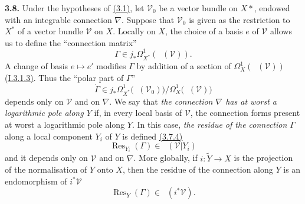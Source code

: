 \documentclass{report}
\newenvironment{rmenv}[1]
  {\phantomsection\par\medskip\noindent\textbf{#1.}\rmfamily}
  {\medskip}
\renewcommand{\cal}[1]{{\mathcal{#1}}}
\DeclareMathOperator{\shEnd}{\underline{End}}
\DeclareMathOperator{\Res}{Res}
\begin{document}
\begin{rmenv}{3.8}
\label{II.3.8}
  Under the hypotheses of \hyperref[II.3.1]{(3.1)}, let $\cal{V}_0$ be a vector bundle on $X*$, endowed with an integrable connection $\nabla$.
  Suppose that $\cal{V}_0$ is given as the restriction to $X^*$ of a vector bundle $\cal{V}$ on $X$.
  Locally on $X$, the choice of a basis $e$ of $\cal{V}$ allows us to define the ``connection matrix''
  \[
  \label{II.3.8.1}
    \Gamma \in j_*\Omega_{X^*}^1(\shEnd(\cal{V})).
  \tag{3.8.1}
  \]
  A change of basis $e\mapsto e'$ modifies $\Gamma$ by addition of a section of $\Omega_X^1(\shEnd(\cal{V}))$ \hyperref[I.3.1.3]{(I.3.1.3)}.
  Thus the ``polar part of $\Gamma$''
  \[
  \label{II.3.8.2}
    \dot{\Gamma} \in j_*\Omega_{X^*}^1\big(\shEnd(\cal{V}_0))\big/\Omega_X^1(\shEnd(\cal{V})\big)
  \tag{3.8.2}
  \]
  depends only on $\cal{V}$ and on $\nabla$.
  We say that \emph{the connection $\nabla$ has at worst a logarithmic pole along $Y$} if, in every local basis of $\cal{V}$, the connection forms present at worst a logarithmic pole along $Y$.
  In this case, \emph{the residue of the connection $\Gamma$} along a local component $Y_i$ of $Y$ is defined \hyperref[II.3.7.4]{(3.7.4)}
  \[
  \label{II.3.8.3}
    \Res_{Y_i}(\Gamma) \in \shEnd(\cal{V}|Y_i)
  \tag{3.8.3}
  \]
  and it depends only on $\cal{V}$ and on $\nabla$.
  More globally, if $i\colon\widetilde{Y}\to X$ is the projection of the normalisation of $Y$ onto $X$, then the residue of the connection along $Y$ is an endomorphism of $i^*\cal{V}$
  \[
  \label{II.3.8.4}
    \Res_Y(\Gamma) \in \shEnd(i^*\cal{V}).
  \tag{3.8.4}
  \]
\end{rmenv}
\end{document}

